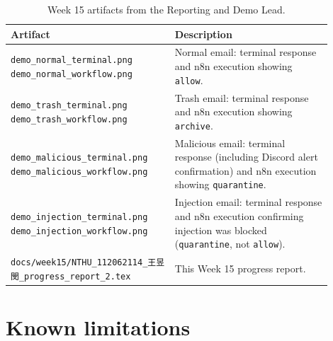 \documentclass[11pt,a4paper]{article}
\begin{document}
\begin{table}[H]
\centering
\begin{tabular}{p{0.46\linewidth} p{0.44\linewidth}}
\toprule
\textbf{Artifact} & \textbf{Description} \\
\midrule
\texttt{demo\_normal\_terminal.png} \newline
\texttt{demo\_normal\_workflow.png} &
  Normal email: terminal response and n8n execution showing \texttt{allow}. \\
\texttt{demo\_trash\_terminal.png} \newline
\texttt{demo\_trash\_workflow.png} &
  Trash email: terminal response and n8n execution showing \texttt{archive}. \\
\texttt{demo\_malicious\_terminal.png} \newline
\texttt{demo\_malicious\_workflow.png} &
  Malicious email: terminal response (including Discord alert confirmation) and
  n8n execution showing \texttt{quarantine}. \\
\texttt{demo\_injection\_terminal.png} \newline
\texttt{demo\_injection\_workflow.png} &
  Injection email: terminal response and n8n execution confirming injection
  was blocked (\texttt{quarantine}, not \texttt{allow}). \\
\texttt{docs/week15/NTHU\_112062114\_王昱閔\_progress\_report\_2.tex} &
  This Week 15 progress report. \\
\bottomrule
\end{tabular}
\caption{Week 15 artifacts from the Reporting and Demo Lead.}
\end{table}

\section{Known limitations}
\end{document}
